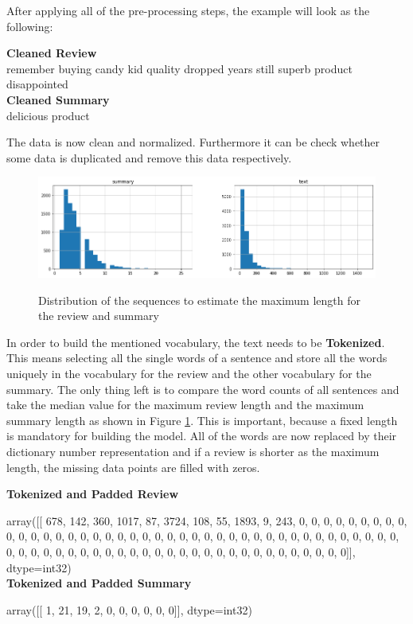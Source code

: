 After applying all of the pre-processing steps, the example will look as the following:

\begin{tcolorbox}
	\textbf{Cleaned Review} \\
	remember buying candy kid quality dropped years still superb product disappointed \\
	
	\textbf{Cleaned Summary} \\
	delicious product
\end{tcolorbox}

The data is now clean and normalized. Furthermore it can be check whether some data is duplicated and remove this data respectively. 

\begin{figure}
	\begin{center}
		\includegraphics[width=6in]{photos/dist_seq}\\
		\caption{Distribution of the sequences to estimate the maximum length for the review and summary}\label{dist_seq}
	\end{center}
\end{figure}

In order to build the mentioned vocabulary, the text needs to be \textbf{Tokenized}. This means selecting all the single words of a sentence and store all the words uniquely in the vocabulary for the review and the other vocabulary for the summary. The only thing left is to compare the word counts of all sentences and take the median value for the maximum review length and the maximum summary length as shown in Figure \ref{dist_seq}. This is important, because a fixed length is mandatory for building the model. All of the words are now replaced by their dictionary number representation and if a review is shorter as the maximum length, the missing data points are filled with zeros.

\begin{tcolorbox}
	\textbf{Tokenized and Padded Review}
	
	array([[ 678,  142,  360, 1017,   87, 3724,  108,   55, 1893,    9,  243,
	0,    0,    0,    0,    0,    0,    0,    0,    0,    0,    0,
	0,    0,    0,    0,    0,    0,    0,    0,    0,    0,    0,
	0,    0,    0,    0,    0,    0,    0,    0,    0,    0,    0,
	0,    0,    0,    0,    0,    0,    0,    0,    0,    0,    0,
	0,    0,    0,    0,    0,    0,    0,    0,    0,    0,    0,
	0,    0,    0,    0,    0,    0,    0,    0,    0,    0,    0,
	0,    0,    0]], dtype=int32) \\
	
	\textbf{Tokenized and Padded Summary}
	
	array([[ 1, 21, 19,  2,  0,  0,  0,  0,  0,  0]], dtype=int32)
\end{tcolorbox}

